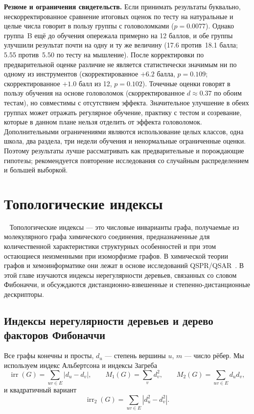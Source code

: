 \documentclass[a4paper,14pt]{extreport}
\theoremstyle{plain}
\theoremstyle{definition}
\theoremstyle{remark}
\begin{document}
\textbf{Резюме и ограничения свидетельств.}
Если принимать результаты буквально, нескорректированное сравнение итоговых оценок по тесту на натуральные и целые числа говорит в пользу группы с головоломками ($p=0.0077$). Однако группа~B ещё до обучения опережала примерно на 12 баллов, и обе группы улучшили результат почти на одну и ту же величину (17.6 против\ 18.1 балла; 5.55 против\ 5.50 по тесту на мышление). После корректировки по предварительной оценке различие не является статистически значимым ни по одному из инструментов (скорректированное $+6.2$ балла, $p=0.109$; скорректированное $+1.0$ балл из 12, $p=0.102$). Точечные оценки говорят в пользу обучения на основе головоломок (скорректированное $d\approx0.37$ по обоим тестам), но совместимы с отсутствием эффекта. Значительное улучшение в обеих группах может отражать регулярное обучение, практику с тестом и созревание, которые в данном плане нельзя отделить от эффекта головоломок. Дополнительными ограничениями являются использование целых классов, одна школа, два раздела, три недели обучения и ненормальные ограниченные оценки. Поэтому результаты лучше рассматривать как предварительные и порождающие гипотезы; рекомендуется повторение исследования со случайным распределением и большей выборкой.
\chapter{Топологические индексы}~\label{sec5}
Топологические индексы --- это числовые инварианты графа, получаемые из молекулярного графа химического соединения, предназначенные для количественной характеристики структурных особенностей и при этом
остающиеся неизменными при изоморфизме графов. В химической теории графов и хемоинформатике они лежат в основе исследований QSPR/QSAR~\cite{Todeschini2000}.
В этой главе изучаются индексы нерегулярности деревьев, связанных со словом Фибоначчи, и обсуждаются дистанционно-взвешенные и степенно-дистанционные дескрипторы.
\section{Индексы нерегулярности деревьев и дерево факторов Фибоначчи}\label{sec5.1}

Все графы конечны и просты, $d_u$ --- степень вершины $u$, $m$ --- число рёбер. Мы используем индекс Альбертсона и индексы Загреба
\begin{equation}
	\operatorname{irr}(G)=\sum_{uv\in E}|d_u-d_v|,\qquad M_1(G)=\sum_{v}d_v^{2},\qquad M_2(G)=\sum_{uv\in E}d_ud_v ,
\end{equation}
и квадратичный вариант
\begin{equation}
	\operatorname{irr}_2(G)=\sum_{uv\in E}|d_u^{2}-d_v^{2}| .
\end{equation}
\end{document}
